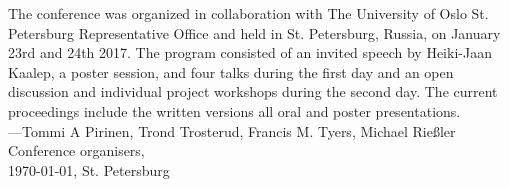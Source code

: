 \documentclass[11pt]{article}
\begin{document}
The conference was organized in collaboration with The University of Oslo St.
Petersburg Representative Office and held in St. Petersburg, Russia, on January
23rd and 24th 2017.  The program consisted of an invited speech by Heiki-Jaan
Kaalep, a poster session, and four  talks during the first day and an open
discussion and individual project workshops during the second day.  The current
proceedings include the written versions all oral and poster presentations.\\

\noindent ---Tommi A Pirinen, Trond Trosterud, Francis M. Tyers, Michael Rie\ss ler\\
Conference organisers,\\
\today, St. Petersburg
\end{document}
